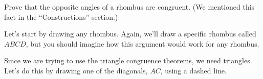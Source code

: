 \documentclass{ximera}
\begin{document}
\begin{example}
Prove that the opposite angles of a rhombus are congruent. (We mentioned this fact in the ``Constructions'' section.) 

Let's start by drawing any rhombus. Again, we'll draw a specific rhombus called $ABCD$, but you should imagine how this argument would work for any rhombus.
\begin{image}\end{image}
Since we are trying to use the triangle congruence theorems, we need triangles. Let's do this by drawing one of the diagonals, $AC$, using a dashed line.
\begin{image}
\end{image}
\end{example}
\end{document}
